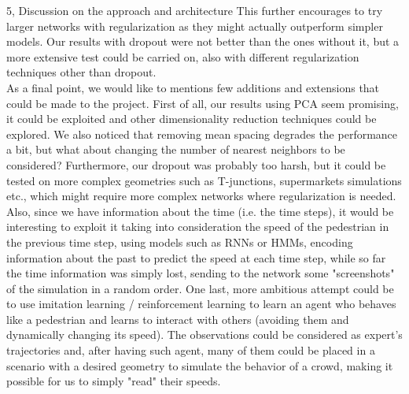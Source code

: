 \documentclass[10pt,a4paper]{article}
\begin{document}
\begin{task}{5, Discussion on the approach and architecture}
This further encourages to try larger networks with regularization as they might actually outperform simpler models.
Our results with dropout were not better than the ones without it, but a more extensive test could be carried on, also with different regularization techniques other than dropout.\\
As a final point, we would like to mentions few additions and extensions that could be made to the project.
First of all, our results using PCA seem promising, it could be exploited and other dimensionality reduction techniques could be explored.
We also noticed that removing mean spacing degrades the performance a bit, but what about changing the number of nearest neighbors to be considered?
Furthermore, our dropout was probably too harsh, but it could be tested on more complex geometries such as T-junctions, supermarkets simulations etc., which might require more complex networks where regularization is needed.
Also, since we have information about the time (i.e. the time steps), it would be interesting to exploit it taking into consideration the speed of the pedestrian in the previous time step, using models such as RNNs or HMMs, encoding information about the past to predict the speed at each time step, while so far the time information was simply lost, sending to the network some "screenshots" of the simulation in a random order.
One last, more ambitious attempt could be to use imitation learning / reinforcement learning to learn an agent who behaves like a pedestrian and learns to interact with others (avoiding them and dynamically changing its speed).
The observations could be considered as expert's trajectories and, after having such agent, many of them could be placed in a scenario with a desired geometry to simulate the behavior of a crowd, making it possible for us to simply "read" their speeds.
\end{task}

\newpage


\end{document}
